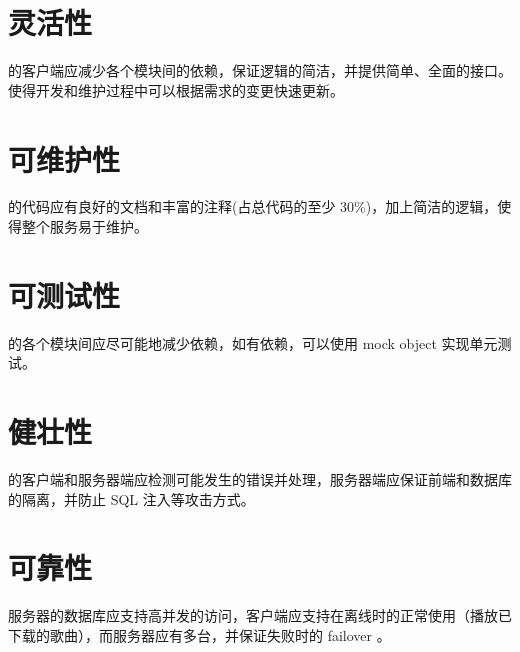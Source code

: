 \section {灵活性}
\proname 的客户端应减少各个模块间的依赖，保证逻辑的简洁，并提供简单、全面的接口。使得开发和维护过程中可以根据需求的变更快速更新。

\section {可维护性}
\proname 的代码应有良好的文档和丰富的注释(占总代码的至少 30\%)，加上简洁的逻辑，使得整个服务易于维护。

\section {可测试性}
\proname 的各个模块间应尽可能地减少依赖，如有依赖，可以使用 mock object 实现单元测试。

\section {健壮性}
\proname 的客户端和服务器端应检测可能发生的错误并处理，服务器端应保证前端和数据库的隔离，并防止 SQL 注入等攻击方式。

\section {可靠性}
\proname 服务器的数据库应支持高并发的访问，客户端应支持在离线时的正常使用（播放已下载的歌曲），而服务器应有多台，并保证失败时的 failover 。

